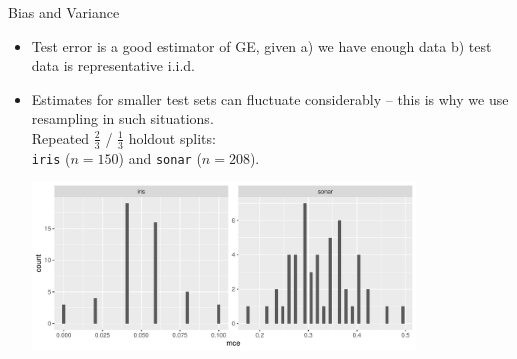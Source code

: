 \documentclass[11pt,compress,t,notes=noshow, xcolor=table]{beamer}
\begin{document}
\begin{vbframe}{Bias and Variance}

\begin{itemize}
  \item Test error is a good estimator of GE,
  given a) we have enough data b) test data is representative i.i.d.
   \item Estimates for smaller test sets can fluctuate considerably -- this is why we use resampling in such situations.\\
   Repeated $\tfrac{2}{3}$ / $\tfrac{1}{3}$ holdout splits:\\
\texttt{iris} ($n=150$) and \texttt{sonar} ($n=208$).\\

\vfill

\begin{center}
\includegraphics[width=0.8\textwidth]{figure/test-error-flucuation} 
\end{center}
\end{itemize}


\end{vbframe}
\end{document}
